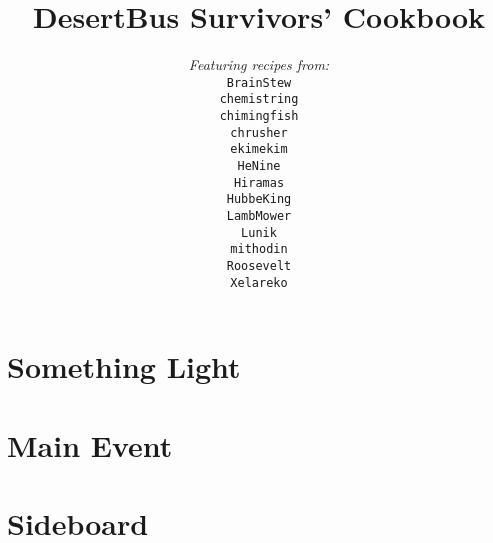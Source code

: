 \documentclass[12pt,a4paper,twoside]{book}
\title{DesertBus Survivors' Cookbook}
\author{\textit{Featuring recipes from:}\\
		\texttt{BrainStew}\\%
		\texttt{chemistring}\\%
		\texttt{chimingfish}\\%
		\texttt{chrusher}\\%
		\texttt{ekimekim}\\%
		\texttt{HeNine}\\%
		\texttt{Hiramas}\\%
		\texttt{HubbeKing}\\%
		\texttt{LambMower}\\%
		\texttt{Lunik}\\%
		\texttt{mithodin}\\%
		\texttt{Roosevelt}\\%
		\texttt{Xelareko}
}
\begin{document}
	\maketitle
	\tableofcontents
	\clearpage

	\chapter{Something Light}
	\clearpage

	
	\clearpage
	
	\clearpage
	
	\clearpage

	
	\clearpage
	
	\clearpage
	
	\clearpage

	\chapter{Main Event}
	\clearpage

	
	\clearpage
	
	\clearpage
	
	\clearpage
	
	\clearpage
	
	\clearpage

	
	\clearpage
	
	\clearpage
	
	\clearpage

	
	\clearpage
	
	\clearpage
	
	\clearpage
	
	\clearpage
	
	\clearpage
	
	\clearpage

	
	\clearpage
	
	\clearpage
	
	\clearpage
	
	\clearpage

	\chapter{Sideboard}
	\clearpage

	
	\clearpage
	
	\clearpage
	
\end{document}
